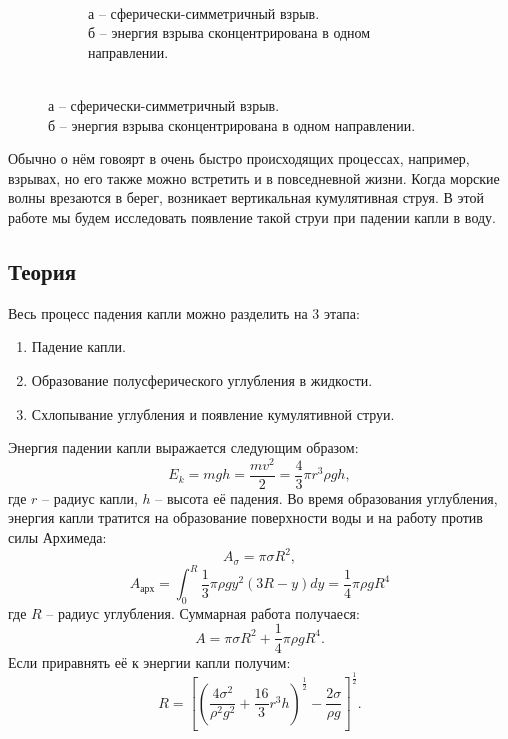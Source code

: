 \documentclass[a4paper, 12pt]{article}
\begin{document}
\begin{figure}[H]
\begin{subfigure}{0.5\textwidth}
        \caption*{\\а -- сферически-симметричный взрыв.\\
                 б -- энергия взрыва сконцентрирована в одном
                 направлении.}
    \end{subfigure}
\end{figure}

Обычно о нём говоярт в очень быстро происходящих процессах, например,
взрывах, но его также можно встретить и в повседневной жизни.
Когда морские волны врезаются в берег, возникает вертикальная
кумулятивная струя. В этой работе мы будем исследовать появление такой
струи при падении капли в воду.

\begin{center}
    \item \section*{Теория}
\end{center}

Весь процесс падения капли можно разделить на 3 этапа:
\begin{enumerate}
    \item Падение капли.
    \item Образование полусферического углубления в жидкости.
    \item Схлопывание углубления и появление кумулятивной струи.
\end{enumerate}

\bigskip

Энергия падении капли выражается следующим образом:
\begin{equation}
    E_k = mgh = \frac{mv^2}{2} = \frac{4}{3}\pi{r^3}{\rho}gh,
\end{equation}
где $r$ -- радиус капли, $h$ -- высота её падения.
Во время образования углубления, энергия капли тратится на образование
поверхности воды и на работу против силы Архимеда:
\begin{equation}
    A_\sigma = \pi{\sigma}R^2,
\end{equation}
\begin{equation}
    A_\text{арх} = \int_{0}^{R} \frac{1}{3}{\pi}{\rho}gy^2(3R-y)dy = 
    \frac{1}{4}\pi{\rho}gR^4
\end{equation}
где $R$ -- радиус углубления.
Суммарная работа получаеся:
\begin{equation}
    A = \pi\sigma{R^2} + \frac{1}{4}\pi{\rho}gR^4.
\end{equation}
Если приравнять её к энергии капли получим:
\begin{equation}
    R = \left [\left (\frac{4\sigma^2}{\rho^2g^2} +
               \frac{16}{3}r^3h \right )^\frac{1}{2}
               - \frac{2\sigma}{\rho{g}} \right ] ^ \frac{1}{2}.
\end{equation}
\end{document}
